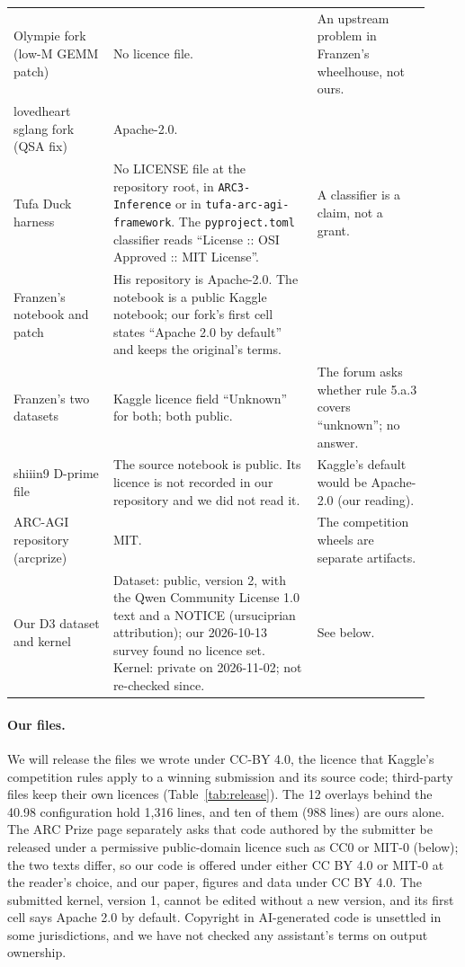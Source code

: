 \begin{longtable}{@{}>{\raggedright\arraybackslash}p{0.22\linewidth}>{\raggedright\arraybackslash}p{0.45\linewidth}>{\raggedright\arraybackslash}p{0.25\linewidth}@{}}
\addlinespace
Olympie fork (low-M GEMM patch)
& No licence file.
& An upstream problem in Franzen's wheelhouse, not ours. \\
\addlinespace
lovedheart sglang fork (QSA fix)
& Apache-2.0.
& \\
\addlinespace
Tufa Duck harness \citep{bessis2026duck}
& No LICENSE file at the repository root, in \texttt{ARC3-Inference} or in \texttt{tufa-arc-agi-framework}. The \texttt{pyproject.toml} classifier reads ``License :: OSI Approved :: MIT License''.
& A classifier is a claim, not a grant. \\
\addlinespace
Franzen's notebook and patch \citep{franzen2026milestone2}
& His repository is Apache-2.0. The notebook is a public Kaggle notebook; our fork's first cell states ``Apache 2.0 by default'' and keeps the original's terms.
& \\
\addlinespace
Franzen's two datasets
& Kaggle licence field ``Unknown'' for both; both public.
& The forum asks whether rule 5.a.3 covers ``unknown''; no answer. \\
\addlinespace
shiiin9 D-prime file \citep{shiiin92026dprime}
& The source notebook is public. Its licence is not recorded in our repository and we did not read it.
& Kaggle's default would be Apache-2.0 (our reading). \\
\addlinespace
ARC-AGI repository (arcprize)
& MIT.
& The competition wheels are separate artifacts. \\
\addlinespace
Our D3 dataset and kernel
& Dataset: public, version 2, with the Qwen Community License 1.0 text and a NOTICE (ursuciprian attribution); our 2026-10-13 survey found no licence set. Kernel: private on 2026-11-02; not re-checked since.
& See below. \\
\end{longtable}
\endgroup

\paragraph{Our files.} We will release the files we wrote under CC-BY 4.0, the licence that Kaggle's competition rules apply to a winning submission and its source code; third-party files keep their own licences (Table~\ref{tab:release}). The 12 overlays behind the 40.98 configuration hold 1,316 lines, and ten of them (988 lines) are ours alone. %
The ARC Prize page separately asks that code authored by the submitter be released under a permissive public-domain licence such as CC0 or MIT-0 (below); the two texts differ, so our code is offered under either CC BY 4.0 or MIT-0 at the reader's choice, and our paper, figures and data under CC BY 4.0. The submitted kernel, version 1, cannot be edited without a new version, and its first cell says Apache 2.0 by default. Copyright in AI-generated code is unsettled in some jurisdictions, and we have not checked any assistant's terms on output ownership.

